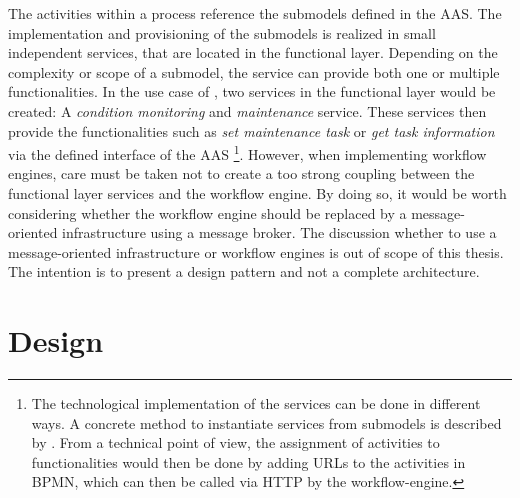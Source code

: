 The activities within a process reference the submodels defined in the \ac{AAS}. The implementation and provisioning of the submodels is realized in small independent services, that are located in the functional layer. Depending on the complexity or scope of a submodel, the service can provide both one or multiple functionalities. In the use case of \citeauthor{Cavalieri2020AShell}, two services in the functional layer would be created: A \textit{condition monitoring} and \textit{maintenance} service. These services then provide the functionalities such as \textit{set maintenance task} or \textit{get task information} via the defined interface of the \ac{AAS} \footnote{The technological implementation of the services can be done in different ways. A concrete method to instantiate services from submodels is described by \citet[p. 7]{BraunischDistributedEinleitung}. From a technical point of view, the assignment of activities to functionalities would then be done by adding URLs to the activities in \ac{BPMN}, which can then be called via HTTP by the workflow-engine.}. However, when implementing workflow engines, care must be taken not to create a too strong coupling between the functional layer services and the workflow engine. By doing so, it would be worth considering whether the workflow engine should be replaced by a message-oriented infrastructure using a message broker. The discussion whether to use a message-oriented infrastructure or workflow engines is out of scope of this thesis. The intention is to present a design pattern and not a complete architecture.

\section{Design} \label{sec:design}

